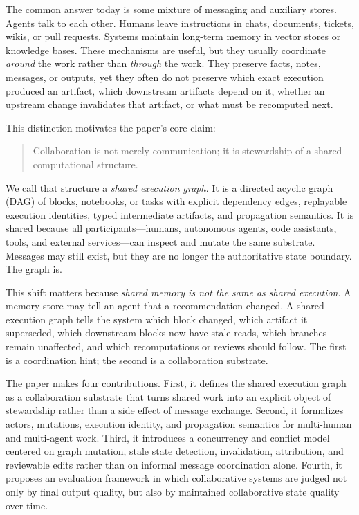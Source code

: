 \documentclass{article}
\begin{document}
The common answer today is some mixture of messaging and auxiliary stores. Agents talk to each other. Humans leave instructions in chats, documents, tickets, wikis, or pull requests. Systems maintain long-term memory in vector stores or knowledge bases. These mechanisms are useful, but they usually coordinate \emph{around} the work rather than \emph{through} the work. They preserve facts, notes, messages, or outputs, yet they often do not preserve which exact execution produced an artifact, which downstream artifacts depend on it, whether an upstream change invalidates that artifact, or what must be recomputed next.

This distinction motivates the paper's core claim:
\begin{quote}
Collaboration is not merely communication; it is stewardship of a shared computational structure.
\end{quote}

We call that structure a \emph{shared execution graph}. It is a directed acyclic graph (DAG) of blocks, notebooks, or tasks with explicit dependency edges, replayable execution identities, typed intermediate artifacts, and propagation semantics. It is shared because all participants---humans, autonomous agents, code assistants, tools, and external services---can inspect and mutate the same substrate. Messages may still exist, but they are no longer the authoritative state boundary. The graph is.

This shift matters because \emph{shared memory is not the same as shared execution}. A memory store may tell an agent that a recommendation changed. A shared execution graph tells the system which block changed, which artifact it superseded, which downstream blocks now have stale reads, which branches remain unaffected, and which recomputations or reviews should follow. The first is a coordination hint; the second is a collaboration substrate.

The paper makes four contributions. First, it defines the shared execution graph as a collaboration substrate that turns shared work into an explicit object of stewardship rather than a side effect of message exchange. Second, it formalizes actors, mutations, execution identity, and propagation semantics for multi-human and multi-agent work. Third, it introduces a concurrency and conflict model centered on graph mutation, stale state detection, invalidation, attribution, and reviewable edits rather than on informal message coordination alone. Fourth, it proposes an evaluation framework in which collaborative systems are judged not only by final output quality, but also by maintained collaborative state quality over time.
\end{document}
